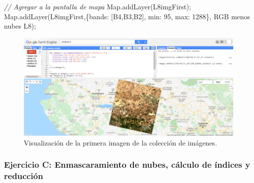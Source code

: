 \documentclass[
  12pt,
  letterpaper,
  twoside]{book}
\newenvironment{Shaded}{\begin{snugshade}}{\end{snugshade}}
\newcommand{\BuiltInTok}[1]{#1}
\newcommand{\CommentTok}[1]{\textcolor[rgb]{0.24,0.58,0.00}{\textit{#1}}}
\newcommand{\DataTypeTok}[1]{\textcolor[rgb]{0.00,0.00,0.00}{#1}}
\newcommand{\DecValTok}[1]{\textcolor[rgb]{0.28,0.53,0.93}{#1}}
\newcommand{\FunctionTok}[1]{\textcolor[rgb]{0.48,0.12,0.64}{#1}}
\newcommand{\NormalTok}[1]{#1}
\newcommand{\OperatorTok}[1]{\textcolor[rgb]{0.00,0.00,0.00}{#1}}
\newcommand{\StringTok}[1]{\textcolor[rgb]{0.87,0.29,0.22}{#1}}
\begin{document}
\begin{Shaded}
\begin{Highlighting}[]
\CommentTok{// Agregar a la pantalla de mapa}
\BuiltInTok{Map}\OperatorTok{.}\FunctionTok{addLayer}\NormalTok{(L8imgFirst)}\OperatorTok{;}
\BuiltInTok{Map}\OperatorTok{.}\FunctionTok{addLayer}\NormalTok{(L8imgFirst}\OperatorTok{,}\NormalTok{\{}\DataTypeTok{bands}\OperatorTok{:}\NormalTok{ [}\StringTok{\textquotesingle{}B4\textquotesingle{}}\OperatorTok{,}\StringTok{\textquotesingle{}B3\textquotesingle{}}\OperatorTok{,}\StringTok{\textquotesingle{}B2\textquotesingle{}}\NormalTok{]}\OperatorTok{,} \DataTypeTok{min}\OperatorTok{:} \DecValTok{95}\OperatorTok{,} \DataTypeTok{max}\OperatorTok{:} \DecValTok{1288}\NormalTok{\}}\OperatorTok{,} 
  \StringTok{\textquotesingle{}RGB menos nubes L8\textquotesingle{}}\NormalTok{)}\OperatorTok{;}
\end{Highlighting}
\end{Shaded}

\begin{figure}[H]

{\centering \includegraphics[width=0.95\linewidth]{Img/RGBIm} 

}

\caption{Visualización de la primera imagen de la colección de imágenes.}\label{fig:f1016}
\end{figure}

\hypertarget{ejercicio-c-enmascaramiento-de-nubes-cuxe1lculo-de-uxedndices-y-reducciuxf3n}{%
\subsubsection*{Ejercicio C: Enmascaramiento de nubes, cálculo de índices y reducción}\label{ejercicio-c-enmascaramiento-de-nubes-cuxe1lculo-de-uxedndices-y-reducciuxf3n}}
\end{document}
